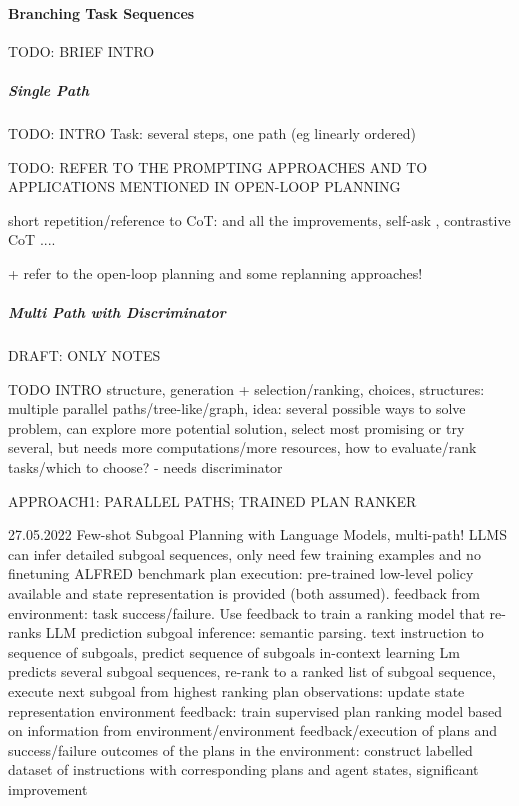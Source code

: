 \documentclass{article}
\begin{document}

\paragraph{Branching Task Sequences}
TODO: BRIEF INTRO

\subparagraph{Single Path}

TODO: INTRO 
Task: several steps, one path (eg linearly ordered)

TODO: REFER TO THE PROMPTING APPROACHES AND TO APPLICATIONS MENTIONED IN OPEN-LOOP PLANNING


short repetition/reference to CoT: 
\cite{kojima_large_2023} and all the improvements, self-ask \cite{press_measuring_2023} , contrastive CoT \cite{chia_contrastive_2023} ....

+ refer to the open-loop planning and some replanning approaches!


\subparagraph{Multi Path with Discriminator}
DRAFT: ONLY NOTES

TODO INTRO structure, generation + selection/ranking, 
choices, structures: multiple parallel paths/tree-like/graph, 
idea: several possible ways to solve problem, 
can explore more potential solution, select most promising or try several, 
but needs more computations/more resources, 
how to evaluate/rank tasks/which to choose? - needs discriminator

APPROACH1: PARALLEL PATHS; TRAINED PLAN RANKER

\cite{logeswaran_few-shot_2022} 27.05.2022 Few-shot Subgoal Planning with Language Models, multi-path!
LLMS can infer detailed subgoal sequences, only need few training examples and no finetuning
ALFRED benchmark
plan execution: pre-trained low-level policy available and state representation is provided (both assumed). feedback from environment: task success/failure. Use feedback to train a ranking model that re-ranks LLM prediction
subgoal inference: semantic parsing. text instruction to sequence of subgoals, predict sequence of subgoals
in-context learning
Lm predicts several subgoal sequences, re-rank to a ranked list of subgoal sequence, execute next subgoal from highest ranking plan
observations: update state representation
environment feedback: train supervised plan ranking model based on information from environment/environment feedback/execution of plans and success/failure outcomes of the plans in the environment: construct labelled dataset of instructions with corresponding plans and agent states, significant improvement
\end{document}
